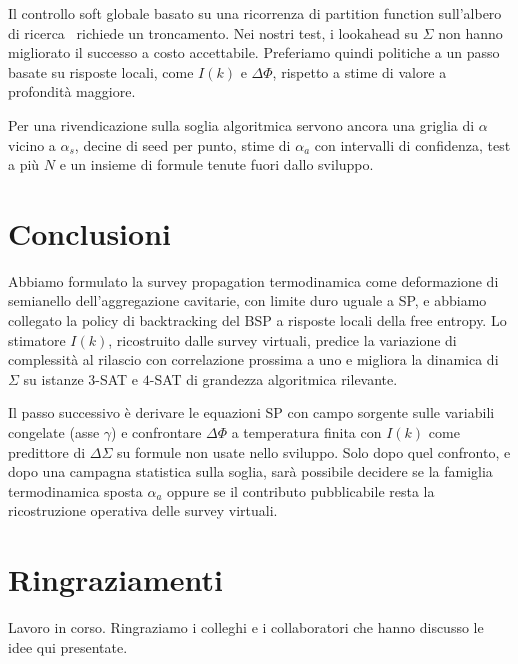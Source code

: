 \documentclass{article}
\newcommand{\Sig}{\Sigma}
\begin{document}
Il controllo soft globale basato su una ricorrenza di partition function sull'albero di ricerca~\cite{kappen2005path} richiede un troncamento.
Nei nostri test, i lookahead su $\Sig$ non hanno migliorato il successo a costo accettabile.
Preferiamo quindi politiche a un passo basate su risposte locali, come $I(k)$ e $\Delta\Phi$, rispetto a stime di valore a profondit\`a maggiore.

Per una rivendicazione sulla soglia algoritmica servono ancora una griglia di $\alpha$ vicino a $\alpha_s$, decine di seed per punto, stime di $\alpha_a$ con intervalli di confidenza, test a pi\`u $N$ e un insieme di formule tenute fuori dallo sviluppo.

\section{Conclusioni}
\label{sec:conclusions}

Abbiamo formulato la survey propagation termodinamica come deformazione di semianello dell'aggregazione cavitarie, con limite duro uguale a SP, e abbiamo collegato la policy di backtracking del BSP a risposte locali della free entropy.
Lo stimatore $I(k)$, ricostruito dalle survey virtuali, predice la variazione di complessit\`a al rilascio con correlazione prossima a uno e migliora la dinamica di $\Sig$ su istanze $3$-SAT e $4$-SAT di grandezza algoritmica rilevante.

Il passo successivo \`e derivare le equazioni SP con campo sorgente sulle variabili congelate (asse $\gamma$) e confrontare $\Delta\Phi$ a temperatura finita con $I(k)$ come predittore di $\Delta\Sig$ su formule non usate nello sviluppo.
Solo dopo quel confronto, e dopo una campagna statistica sulla soglia, sar\`a possibile decidere se la famiglia termodinamica sposta $\alpha_a$ oppure se il contributo pubblicabile resta la ricostruzione operativa delle survey virtuali.

\section*{Ringraziamenti}
Lavoro in corso.
Ringraziamo i colleghi e i collaboratori che hanno discusso le idee qui presentate.



\end{document}
